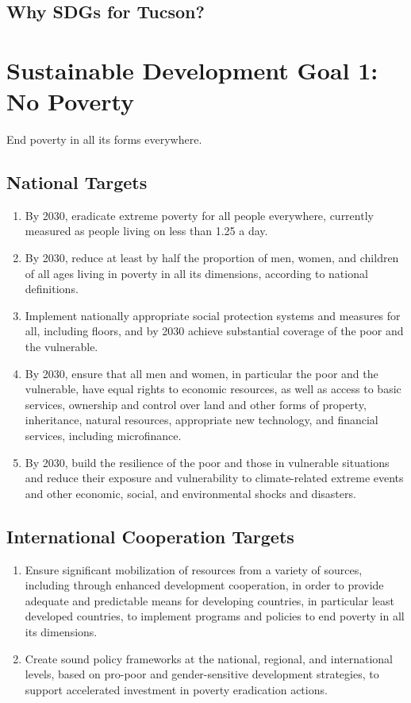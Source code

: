 \documentclass[11pt]{book}
\begin{document}
	\section{Why SDGs for Tucson?}

\tableofcontents

\mainmatter

\chapter{Sustainable Development Goal 1: No Poverty}

\Large End poverty in all its forms everywhere.

	\section{National Targets}
	
	\begin{enumerate}
		\item By 2030, eradicate extreme poverty for all people everywhere, currently measured as people living on less than 1.25 a day.
		\item By 2030, reduce at least by half the proportion of men, women, and children of all ages living in poverty in all its dimensions, according to national definitions.
		\item Implement nationally appropriate social protection systems and measures for all, including floors, and by 2030 achieve substantial coverage of the poor and the vulnerable.
		\item By 2030, ensure that all men and women, in particular the poor and the vulnerable, have equal rights to economic resources, as well as access to basic services, ownership and control over land and other forms of property, inheritance, natural resources, appropriate new technology, and financial services, including microfinance.
		\item By 2030, build the resilience of the poor and those in vulnerable situations and reduce their exposure and vulnerability to climate-related extreme events and other economic, social, and environmental shocks and disasters.
	\end{enumerate}

	\section{International Cooperation Targets}
	
	\begin{enumerate}
		\item Ensure significant mobilization of resources from a variety of sources, including through enhanced development cooperation, in order to provide adequate and predictable means for developing countries, in particular least developed countries, to implement programs and policies to end poverty in all its dimensions.
		\item Create sound policy frameworks at the national, regional, and international levels, based on pro-poor and gender-sensitive development strategies, to support accelerated investment in poverty eradication actions.
	\end{enumerate}
\end{document}
